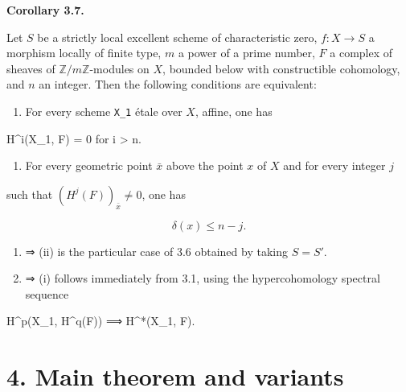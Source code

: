 \documentclass[
  11pt,
  a4paper,
]{book}
\newenvironment{Shaded}{}{}
\newcommand{\NormalTok}[1]{#1}
\providecommand{\tightlist}{%
  \setlength{\itemsep}{0pt}\setlength{\parskip}{0pt}}
\begin{document}
\textbf{Corollary 3.7.}

Let \(S\) be a strictly local excellent scheme of characteristic zero,
\(f : X \to S\) a morphism locally of finite type, \(m\) a power of a
prime number, \(F\) a complex of sheaves of
\(\mathbb{Z}/m\mathbb{Z}\)-modules on \(X\), bounded below with
constructible cohomology, and \(n\) an integer. Then the following
conditions are equivalent:

\begin{enumerate}
\def\labelenumi{(\roman{enumi})}
\tightlist
\item
  For every scheme \texttt{X\_1} étale over \(X\), affine, one has
\end{enumerate}

\begin{Shaded}
\begin{Highlighting}[]
\NormalTok{H\^{}i(X\_1, F) = 0 for i \textgreater{} n.}
\end{Highlighting}
\end{Shaded}

\begin{enumerate}
\def\labelenumi{(\roman{enumi})}
\setcounter{enumi}{1}
\tightlist
\item
  For every geometric point \(\bar{x}\) above the point \(x\) of \(X\)
  and for every integer \(j\)
\end{enumerate}

such that \((H^{j}(F))_{\bar{x}} \neq 0\), one has

\[ \delta(x) \leqslant n - j. \]

\begin{enumerate}
\def\labelenumi{(\roman{enumi})}
\item
  ⇒ (ii) is the particular case of 3.6 obtained by taking \(S = S'\).
\item
  ⇒ (i) follows immediately from 3.1, using the hypercohomology spectral
  sequence
\end{enumerate}

\begin{Shaded}
\begin{Highlighting}[]
\NormalTok{H\^{}p(X\_1, H\^{}q(F)) ⟹ H\^{}*(X\_1, F).}
\end{Highlighting}
\end{Shaded}

\section{4. Main theorem and variants}\label{main-theorem-and-variants}
\end{document}
